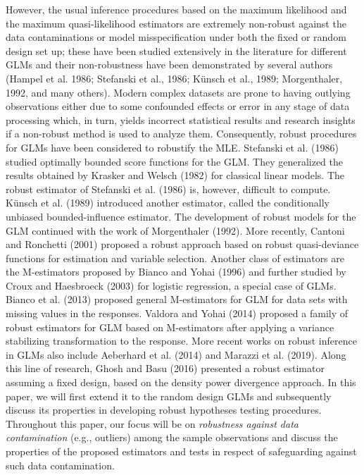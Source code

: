 \documentclass[a4paper]{article}%
\begin{document}
However, the usual inference procedures based on the maximum likelihood and the maximum quasi-likelihood
estimators are extremely non-robust against the data contaminations or model misspecification
under both the fixed or random design set up; these have been studied extensively in the literature for different GLMs
and their non-robustness have been demonstrated by several authors
(Hampel et al. 1986; Stefanski et al., 1986; K\"{u}nsch et al., 1989; Morgenthaler, 1992, and many others). 
Modern complex datasets are prone to having outlying observations either due to 
some confounded effects or error in any stage of data processing which, in turn,
yields incorrect statistical results and research insights if a non-robust method is used to analyze them. 
Consequently,  robust procedures for GLMs have been considered to robustify the MLE. 
Stefanski et al. (1986) studied optimally bounded score functions for the GLM. 
They generalized the results obtained by Krasker and Welsch (1982) for classical linear models. 
The robust estimator of Stefanski et al. (1986) is, however, difficult to compute. 
K\"{u}nsch et al. (1989) introduced another estimator, called the conditionally unbiased bounded-influence estimator. 
The development of robust models for the GLM continued with the work of Morgenthaler (1992). 
More recently, Cantoni and Ronchetti (2001) proposed a robust approach based on robust quasi-deviance
functions for estimation and variable selection. 
Another class of estimators are the M-estimators proposed by Bianco and Yohai (1996)  
and further studied by Croux and Haesbroeck (2003) for logistic regression, a special case of GLMs. 
Bianco et al. (2013) proposed general M-estimators for GLM for data sets with missing values in the responses.
Valdora and Yohai (2014) proposed a family of robust estimators for GLM based
on M-estimators after applying a variance stabilizing transformation to the response. 
More recent works on robust inference in GLMs also include Aeberhard et al. (2014) and Marazzi et al. (2019).
Along this line of research,  Ghosh and Basu (2016) presented a robust estimator
assuming a fixed design, based on the density power divergence approach.
In this paper, we will first extend it to the random design GLMs 
and subsequently discuss its properties in developing robust hypotheses testing procedures.
Throughout this paper, our focus will be on \textit{robustness against data contamination} (e.g., outliers) 
among the sample observations and discuss the properties of the proposed estimators and tests 
in respect of safeguarding against such data contamination.
\end{document}
